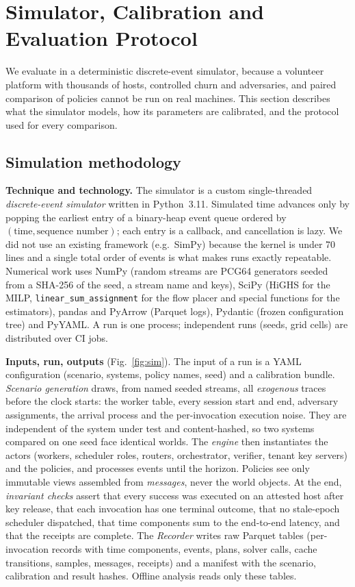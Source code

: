 \section{Simulator, Calibration and Evaluation Protocol}
\label{sec:method}

We evaluate \voss{} in a deterministic discrete-event simulator, because a volunteer platform with thousands of hosts, controlled churn and adversaries,
and paired comparison of policies cannot be run on real machines. This section describes what the simulator models, how its parameters are
calibrated, and the protocol used for every comparison.

\subsection{Simulation methodology}
\label{sec:sim}
\textbf{Technique and technology.} The simulator is a custom single-threaded \emph{discrete-event simulator} written in Python~3.11. Simulated time advances only by popping the earliest entry of a binary-heap event queue ordered by $(\text{time},\text{sequence number})$; each entry is a callback, and cancellation is lazy.
We did not use an existing framework (e.g.\ SimPy) because the kernel is under 70 lines and a single total order of events is what makes runs exactly repeatable. Numerical work uses NumPy (random streams are PCG64 generators seeded from a SHA-256 of the seed, a stream name and keys), SciPy (HiGHS for the MILP, \texttt{linear\_sum\_assignment} for the flow placer and special functions for the estimators),
pandas and PyArrow (Parquet logs), Pydantic (frozen configuration tree) and PyYAML. A run is one process; independent runs (seeds, grid cells) are distributed over CI jobs.

\textbf{Inputs, run, outputs} (Fig.~\ref{fig:sim}). The input of a run is a YAML configuration (scenario, systems, policy names, seed) and a calibration bundle. \emph{Scenario generation} draws, from named seeded streams, all \emph{exogenous} traces before the clock starts: the worker table, every session start and end, adversary assignments, the arrival process and the per-invocation execution noise. They are independent of the system under test and content-hashed, so two systems compared on one seed face identical worlds.
The \emph{engine} then instantiates the actors (workers, scheduler roles, routers, orchestrator, verifier, tenant key servers) and the policies, and processes events until the horizon. Policies see only immutable views assembled from \emph{messages}, never the world objects. At the end, \emph{invariant checks} assert that every success was executed on an attested host after key release,
that each invocation has one terminal outcome, that no stale-epoch scheduler dispatched, that time components sum to the end-to-end latency, and that the receipts are complete. The \emph{Recorder} writes raw Parquet tables (per-invocation records with time components, events, plans, solver calls, cache transitions, samples, messages, receipts) and a manifest with the scenario, calibration and result hashes. Offline analysis reads only these tables.


